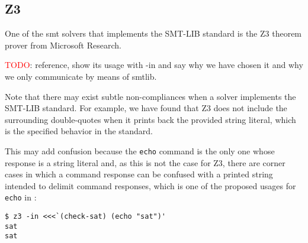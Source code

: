 \subsection{Z3}

One of the \acrshort{smt} solvers that implements the SMT-LIB standard is the
Z3 theorem prover from Microsoft Research.

\textcolor{red}{TODO}: reference, show its usage with -in and say why we have
chosen it and why we only communicate by means of smtlib.

Note that there may exist subtle non-compliances when a solver implements the
SMT-LIB standard. For example, we have found that Z3 does not include the
surrounding double-quotes when it prints back the provided string literal,
which is the specified behavior in the standard.

This may add confusion because the \verb|echo| command is the only one whose
response is a string literal and, as this is not the case for Z3, there are 
corner cases in which a command response can be confused with a printed string
intended to delimit command responses, which is one of the proposed usages for
\verb|echo| in \cite{smtLibStandard}:

\begin{verbatim}
$ z3 -in <<<`(check-sat) (echo "sat")'
sat
sat
\end{verbatim}
